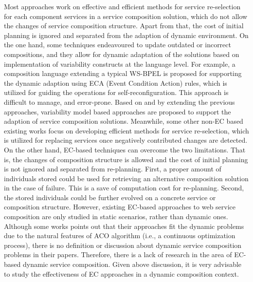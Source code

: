 Most approaches work on effective and efficient methods for service re-selection for each component services in a service composition solution, which do not allow the changes of service composition structure. Apart from that, the cost of initial planning is ignored and separated from the adaption of dynamic environment. On the one hand, some techniques \cite{andrews2003business,baresi2011self,koning2009vxbpel} endeavoured to update outdated or incorrect compositions, and they allow for dynamic adaptation of the solutions based on implementation of variability constructs at the language level. For example, a composition language extending a typical WS-BPEL \cite{andrews2003business} is proposed for supporting the dynamic adaption using ECA (Event Condition Action) rules, which is utilized for guiding the operations for self-reconfiguration. This approach is difficult to manage, and error-prone. Based on and by extending the previous approaches, variability model based approaches \cite{alferez2014dynamic} are proposed to support the adaption of service composition solutions. Meanwhile, some other non-EC based existing works \cite{mohanty2010web,salas2006ws,wagner2016robust,yin2010qos} focus on developing efficient methods for service re-selection, which is utilized for replacing services once negatively contributed changes are detected. On the other hand, EC-based techniques can overcome the two limitations. That is, the changes of composition structure is allowed and the cost of initial planning is not ignored and separated from re-planning. First, a proper amount of individuals stored could be used for retrieving an alternative composition solution in the case of failure. This is a save of computation cost for re-planning. Second, the stored individuals could be further evolved on a concrete service or composition structure. However, existing EC-based approaches to web service composition are only studied in static scenarios, rather than dynamic ones. Although some works \cite{feng2013dynamic,liu2005dynamic} points out that their approaches fit the dynamic problems due to the natural features of ACO algorithm (i.e., a continuous optimization process), there is no definition or discussion about dynamic service composition problems in their papers. Therefore, there is a lack of research in the area of EC-based dynamic service composition. Given above discussion, it is very advisable to study the effectiveness of EC approaches in a dynamic composition context.


